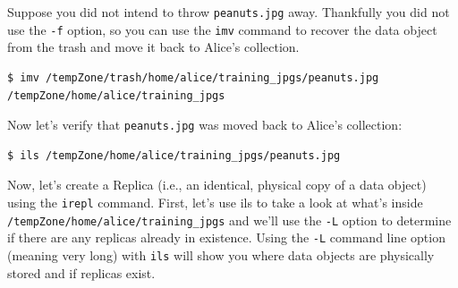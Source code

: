 \documentclass[10pt,oneside]{memoir}
\begin{document}
Suppose you did not intend to throw \texttt{peanuts.jpg} away. Thankfully you did not use the
\texttt{-f} option, so you can use the \texttt{imv} command to recover the data object from the trash and move it back to Alice's collection.

\begin{lstlisting}[basicstyle=\tiny\ttfamily]
$ imv /tempZone/trash/home/alice/training_jpgs/peanuts.jpg /tempZone/home/alice/training_jpgs
\end{lstlisting}

Now let's verify that \texttt{peanuts.jpg} was moved back to Alice's collection:

\begin{lstlisting}
$ ils /tempZone/home/alice/training_jpgs/peanuts.jpg
\end{lstlisting}

\newpage

Now, let's create a Replica (i.e., an identical, physical copy of a data object) using the \texttt{irepl} command. First, let's use ils to take a look at what's inside \texttt{/tempZone/home/alice/training\_jpgs} and we'll use the \texttt{-L} option to determine if there are any replicas already in existence. Using the \texttt{-L} command line option (meaning very long) with \texttt{ils} will show you where data objects are physically stored and if replicas exist.
\end{document}
